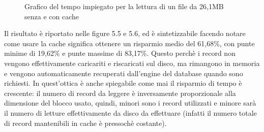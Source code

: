 \begin{figure}
\centering
{}
\caption{Grafico del tempo impiegato per la lettura di un file da 26,1MB senza e con cache}
\label{:}
\end{figure}

Il risultato è riportato nelle figure 5.5 e 5.6, ed è sintetizzabile facendo notare come usare la cache significa ottenere un risparmio medio del 61,68\%, con punte minime di 19,62\% e punte massime di 83,17\%. Questo perchè i record non vengono effettivamente caricariti e riscaricati sul disco, ma rimangono in memoria e vengono automaticamente recuperati dall'engine del database quando sono richiesti. In quest'ottica è anche spiegabile come mai il risparmio di tempo è crescente: il numero di record da leggere è inversamente proporzionale alla dimensione del blocco usato, quindi, minori sono i record utilizzati e minore sarà il numero di letture effettivamente da disco da effettuare (infatti il numero totale di record mantenibili in cache è pressochè costante).